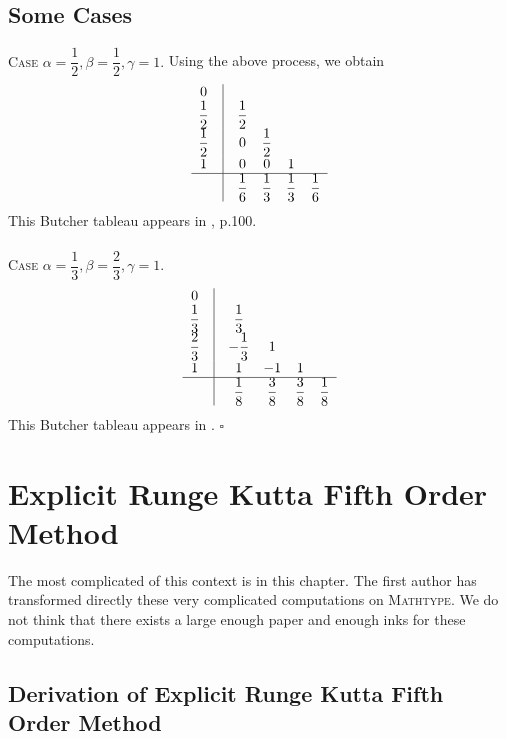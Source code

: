 \documentclass[a4paper,oneside]{book}
\numberwithin{equation}{chapter}
\begin{document}
\section{Some Cases}
\textsc{Case $\alpha  = \dfrac{1}{2},\beta  = \dfrac{1}{2},\gamma  = 1$.} Using the above process, we obtain
\begin{align}
\begin{array}{*{20}{c}}
0&\vline& {}&{}&{}&{}\\
{\dfrac{1}{2}}&\vline& {\dfrac{1}{2}}&{}&{}&{}\\
{\dfrac{1}{2}}&\vline& 0&{\dfrac{1}{2}}&{}&{}\\
1&\vline& 0&0&1&{}\\
\hline
{}&\vline& {\dfrac{1}{6}}&{\dfrac{1}{3}}&{\dfrac{1}{3}}&{\dfrac{1}{6}}
\end{array}
\end{align}
This Butcher tableau appears in \cite{butcher}, p.100.\\
\\
\textsc{Case $\alpha  = \dfrac{1}{3},\beta  = \dfrac{2}{3},\gamma  = 1$.}
\begin{align}
\begin{array}{*{20}{c}}
0&\vline& {}&{}&{}&{}\\
{\dfrac{1}{3}}&\vline& {\dfrac{1}{3}}&{}&{}&{}\\
{\dfrac{2}{3}}&\vline& { - \dfrac{1}{3}}&1&{}&{}\\
1&\vline& 1&{ - 1}&1&{}\\
\hline
{}&\vline& {\dfrac{1}{8}}&{\dfrac{3}{8}}&{\dfrac{3}{8}}&{\dfrac{1}{8}}
\end{array}
\end{align}
This Butcher tableau appears in \cite{user2}.  \hfill $\square$
\chapter{Explicit Runge Kutta Fifth Order Method}
The most complicated of this context is in this chapter. The first author has transformed directly these very complicated computations on \textsc{Mathtype}. We do not think that there exists a large enough paper and enough inks for these computations. 
\section{Derivation of Explicit Runge Kutta Fifth Order Method}
\end{document}
